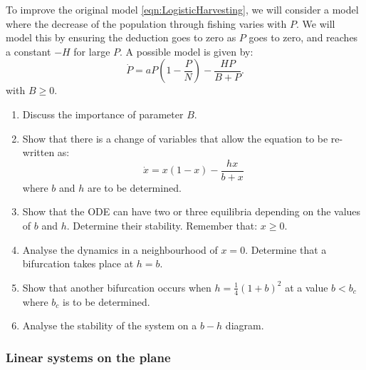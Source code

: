\documentclass{article}
\begin{document}
\begin{question}
To improve the original model \eqref{eqn:LogisticHarvesting}, we will consider a model where the decrease of the population through fishing varies with $P$. We will model this by ensuring the deduction goes to zero as $P$ goes to zero, and reaches a constant $-H$ for large $P$. A possible model is given by:
\begin{equation}
    \label{eqn:LogisticHarvestingImproved}
    \dot P = a P\left(1-\frac{P}{N}\right)-\frac{H P}{B+P}.
  \end{equation}
  with $B\geqslant 0$.
\begin{enumerate}[label=(\alph*),resume]
  \item Discuss the importance of parameter $B$.
  \item Show that there is a change of variables that allow the equation to be re-written as:
  \begin{equation}
    \dot x = x(1-x) -\frac{hx}{b+x}
  \end{equation}
  where $b$ and $h$ are to be determined.
  \item Show that the ODE can have two or three equilibria depending on the values of $b$ and $h$. Determine their stability. Remember that: $x\geqslant 0$.
  \item Analyse the dynamics in a neighbourhood of $x=0$.  Determine that a bifurcation takes place at $h = b$.
  \item Show that another bifurcation occurs when $h=\frac{1}{4}(1+b)^2$ at a value $b < b_c$ where $b_c$ is to be determined.
   \item Analyse the stability of the system on a $b-h$ diagram.
\end{enumerate}
\end{question}

\subsubsection*{Linear systems on the plane}
\end{document}
